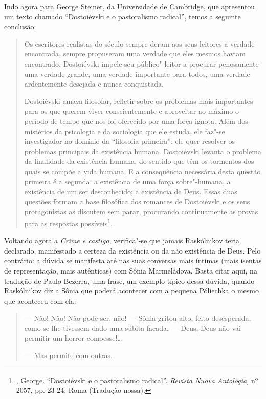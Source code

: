 {{Indo agora para George Steiner, da Universidade de Cambridge, que
apresentou um texto chamado ``Dostoiévski e o pastoralismo radical'',
temos a seguinte conclusão:

\begin{quote}
Os escritores realistas do século  sempre deram aos seus leitores a
verdade encontrada, sempre propuseram uma verdade que eles mesmos haviam
encontrado. Dostoiévski impele seu público"-leitor a procurar penosamente
uma verdade grande, uma verdade importante para todos, uma verdade
ardentemente desejada e nunca conquistada.

Dostoiévski amava filosofar, refletir sobre os problemas mais
importantes para os que querem viver conscientemente e aproveitar ao
máximo o período de tempo que nos foi oferecido por uma força ignota.
Além dos mistérios da psicologia e da sociologia que ele estuda, ele
faz"-se investigador no domínio da ``filosofia primeira'': ele quer
resolver os problemas principais da existência humana. Dostoiévski
levanta o problema da finalidade da existência humana, do sentido que
têm os tormentos dos quais se compõe a vida humana. E a consequência
necessária desta questão primeira é a segunda: a existência de uma força
sobre"-humana, a existência de um ser desconhecido; a existência de Deus.
Essas duas questões formam a base filosófica dos romances de Dostoiévski
e os seus protagonistas as discutem sem parar, procurando continuamente
as provas para as respostas possíveis\footnote{, George.
  ``Dostoiévski e o pastoralismo radical''. \emph{Revista Nuova Antologia,}
  nº 2057, pp. 23-24, Roma (Tradução nossa).}.
\end{quote}

Voltando agora a \emph{Crime e castigo}, verifica"-se que jamais
Raskólnikov teria declarado, manifestado a certeza da existência ou da
não existência de Deus. Pelo contrário: a dúvida se manifesta até nas
suas conversas mais íntimas (mais isentas de representação, mais
autênticas) com Sônia Marmeládova. Basta citar aqui, na tradução de
Paulo Bezerra, uma frase, um exemplo típico dessa dúvida, quando
Raskólnikov diz a Sônia que poderá acontecer com a pequena Póliechka o
mesmo que aconteceu com ela:

\begin{quote}
--- Não! Não! Não pode ser, não! --- Sônia gritou alto, feito desesperada,
como se lhe tivessem dado uma súbita facada. --- Deus, Deus não vai
permitir um horror comoesse!\ldots{}

--- Mas permite com outras.


\end{quote}}}
